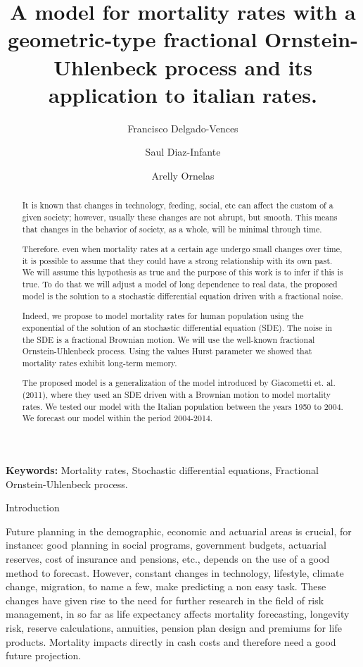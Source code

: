 \documentclass[12pt,reqno]{amsart}
\title[A  model for mortality rates with a geometric-type fOU]{A model for mortality rates with a geometric-type fractional Ornstein-Uhlenbeck process and its application to  italian rates.}
\author[{\small F. Delgado-Vences}]{Francisco Delgado-Vences}
\author[{\small S. Diaz-Infante}]{Saul Diaz-Infante}
\author[{\small A. Ornelas}]{Arelly Ornelas}
\makeatletter
\def\section{\@startsection{section}{1}%
     \z@{.7\linespacing\@plus\linespacing}{.5\linespacing}%
     {\bfseries
     \centering
     }}
\theoremstyle{definition}
\theoremstyle{remark}
\numberwithin{equation}{section}
\makeatother
\begin{document}
\maketitle


\medskip\noindent
{\bf Keywords:} Mortality rates, Stochastic differential equations, Fractional Ornstein-Uhlenbeck process.

\allowdisplaybreaks


\begin{abstract}
It is known that changes in technology, feeding, social, etc can affect the custom of a given society; however, usually
these changes are not abrupt, but smooth. This means that changes in the behavior of society, as a whole, will be minimal through time.

Therefore. even when mortality rates at a certain age undergo small changes over time, it is possible to assume that they could have a strong relationship with its own past. We will assume this hypothesis as true and the purpose of this work is to infer if this is true. To do that we will adjust a model of long dependence to real data, the proposed model is the solution to a stochastic differential equation driven with a fractional noise.

Indeed, we propose to model mortality rates for human population using the exponential of the solution of an stochastic
differential equation (SDE). The noise in the SDE is a fractional Brownian motion. We will use the
 well-known fractional Ornstein-Uhlenbeck process. Using the values Hurst parameter we showed that  mortality rates exhibit long-term memory.

The proposed model is a generalization of the model introduced by
Giacometti et. al. (2011), where they used an SDE driven with a Brownian motion  to model mortality rates. We tested our model with the Italian population between the years 1950 to 2004. We forecast our model within the period 2004-2014.
\end{abstract}


\section{Introduction}
\label{intro}

Future planning in the demographic, economic and actuarial areas is crucial, for instance: good planning in
social programs, government budgets, actuarial reserves, cost of insurance and pensions, etc.,
depends on the use of a good method to forecast. However,  constant changes in technology,
lifestyle, climate change, migration, to name a few, make  predicting  a non easy task. These changes
have given rise to the need for further research in the  field of risk management, in so far as life expectancy affects mortality
forecasting, longevity risk, reserve calculations, annuities, pension plan design and premiums for life products.
Mortality  impacts directly in  cash costs and therefore need a good future projection. \\
\end{document}
